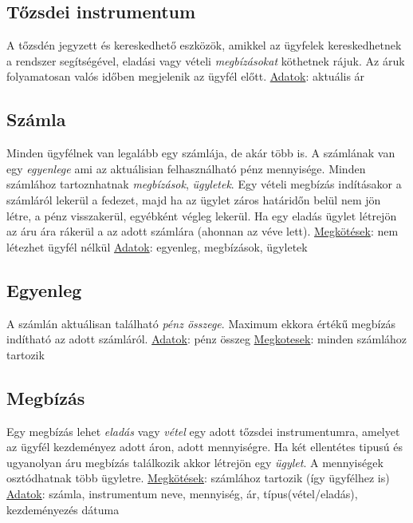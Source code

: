 \subsection{Tőzsdei instrumentum}
A tőzsdén jegyzett és kereskedhető eszközök, amikkel az ügyfelek kereskedhetnek a rendszer segítségével, eladási vagy vételi \emph{megbízásokat} köthetnek rájuk. Az áruk folyamatosan valós időben megjelenik az ügyfél előtt.
\newline \underline{Adatok}: aktuális ár

\subsection{Számla}
Minden ügyfélnek van legalább egy számlája, de akár több is. A számlának van egy \emph{egyenlege} ami az aktuálisian felhasználható pénz mennyisége. Minden számlához tartoznhatnak \emph{megbízások}, \emph{ügyletek}. Egy vételi megbízás indításakor a számláról lekerül a fedezet, majd ha az ügylet záros határidőn belül nem jön létre, a pénz visszakerül, egyébként végleg lekerül. Ha egy eladás ügylet létrejön az áru ára rákerül a az adott számlára (ahonnan az véve lett).
\newline \underline{Megkötések}: nem létezhet ügyfél nélkül
\newline \underline{Adatok}: egyenleg, megbízások, ügyletek

\subsection{Egyenleg}
A számlán aktuálisan található \emph{pénz összege}. Maximum ekkora értékű megbízás indítható az adott számláról.
\newline \underline{Adatok}: pénz összeg
\newline \underline{Megkotesek}: minden számlához tartozik

\subsection{Megbízás}
Egy megbízás lehet \emph{eladás} vagy \emph{vétel} egy adott tőzsdei instrumentumra, amelyet az ügyfél kezdeményez adott áron, adott mennyiségre. Ha két ellentétes tipusú és ugyanolyan áru megbízás találkozik akkor létrejön egy \emph{ügylet}. A mennyiségek osztódhatnak több ügyletre.
\newline \underline{Megkötések}: számlához tartozik (így ügyfélhez is)
\newline \underline{Adatok}: számla, instrumentum neve, mennyiség, ár, típus(vétel/eladás), kezdeményezés dátuma

